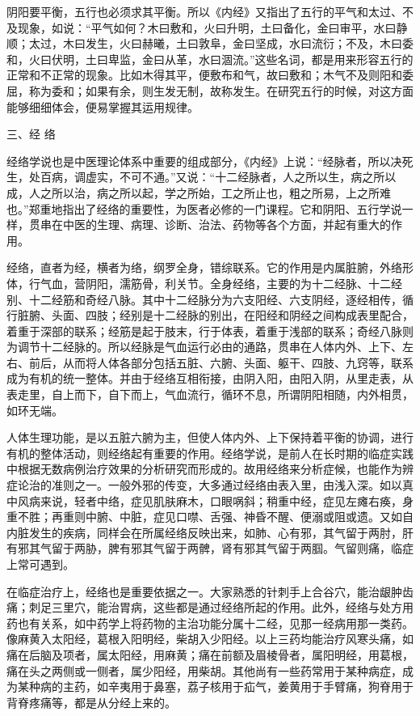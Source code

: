 \documentclass[12pt,UTF8]{ctexbook}
\begin{document}
阴阳要平衡，五行也必须求其平衡。所以《内经》又指出了五行的平气和太过、不及现象，如说：“平气如何？木曰敷和，火曰升明，土曰备化，金曰审平，水曰静顺；太过，木曰发生，火曰赫曦，土曰敦阜，金曰坚成，水曰流衍；不及，木曰委和，火曰伏明，土曰卑监，金曰从革，水曰涸流。”这些名词，都是用来形容五行的正常和不正常的现象。比如木得其平，便敷布和气，故曰敷和；木气不及则阳和委屈，称为委和；如果有余，则生发无制，故称发生。在研究五行的时候，对这方面能够细细体会，便易掌握其运用规律。

三、经 络

经络学说也是中医理论体系中重要的组成部分，《内经》上说：“经脉者，所以决死生，处百病，调虚实，不可不通。”又说：“十二经脉者，人之所以生，病之所以成，人之所以治，病之所以起，学之所始，工之所止也，粗之所易，上之所难也。”郑重地指出了经络的重要性，为医者必修的一门课程。它和阴阳、五行学说一样，贯串在中医的生理、病理、诊断、治法、药物等各个方面，并起有重大的作用。

经络，直者为经，横者为络，纲罗全身，错综联系。它的作用是内属脏腑，外络形体，行气血，营阴阳，濡筋骨，利关节。全身经络，主要的为十二经脉、十二经别、十二经筋和奇经八脉。其中十二经脉分为六支阳经、六支阴经，逐经相传，循行脏腑、头面、四肢；经别是十二经脉的别出，在阳经和阴经之间构成表里配合，着重于深部的联系；经筋是起于肢末，行于体表，着重于浅部的联系；奇经八脉则为调节十二经脉的。所以经脉是气血运行必由的通路，贯串在人体内外、上下、左右、前后，从而将人体各部分包括五脏、六腑、头面、躯干、四肢、九窍等，联系成为有机的统一整体。并由于经络互相衔接，由阴入阳，由阳入阴，从里走表，从表走里，自上而下，自下而上，气血流行，循环不息，所谓阴阳相随，内外相贯，如环无端。

人体生理功能，是以五脏六腑为主，但使人体内外、上下保持着平衡的协调，进行有机的整体活动，则经络起有重要的作用。经络学说，是前人在长时期的临症实践中根据无数病例治疗效果的分析研究而形成的。故用经络来分析症候，也能作为辨症论治的准则之一。一般外邪的传变，大多通过经络由表入里，由浅入深。如以真中风病来说，轻者中络，症见肌肤麻木，口眼㖞斜；稍重中经，症见左瘫右痪，身重不胜；再重则中腑、中脏，症见口噤、舌强、神昏不醒、便溺或阻或遗。又如自内脏发生的疾病，同样会在所属经络反映出来，如肺、心有邪，其气留于两肘，肝有邪其气留于两胁，脾有邪其气留于两髀，肾有邪其气留于两腘。气留则痛，临症上常可遇到。

在临症治疗上，经络也是重要依据之一。大家熟悉的针刺手上合谷穴，能治龈肿齿痛；刺足三里穴，能治胃病，这些都是通过经络所起的作用。此外，经络与处方用药也有关系，如中药学上将药物的主治功能分属十二经，见那一经病用那一类药。像麻黄入太阳经，葛根入阳明经，柴胡入少阳经。以上三药均能治疗风寒头痛，如痛在后脑及项者，属太阳经，用麻黄；痛在前额及眉棱骨者，属阳明经，用葛根，痛在头之两侧或一侧者，属少阳经，用柴胡。其他尚有一些药常用于某种病症，成为某种病的主药，如辛夷用于鼻塞，荔子核用于疝气，姜黄用于手臂痛，狗脊用于背脊疼痛等，都是从分经上来的。
\end{document}
